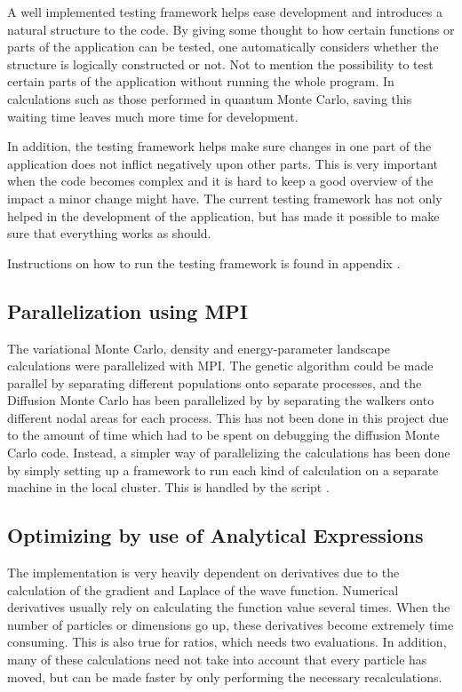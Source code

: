 \documentclass[aps,prb,twocolumn,floatfix]{revtex4}
\newcommand{\class}[1]{{\sffamily{#1}}}
\begin{document}
A well implemented testing framework helps ease development and introduces a natural structure to the code. By giving some thought to how certain functions or parts of the application can be tested, one automatically considers whether the structure is logically constructed or not. Not to mention the possibility to test certain parts of the application without running the whole program. In calculations such as those performed in quantum Monte Carlo, saving this waiting time leaves much more time for development.

In addition, the testing framework helps make sure changes in one part of the application does not inflict negatively upon other parts. This is very important when the code becomes complex and it is hard to keep a good overview of the impact a minor change might have. The current testing framework has not only helped in the development of the application, but has made it possible to make sure that everything works as should.

Instructions on how to run the testing framework is found in appendix \label{sec:runtesting}.

\subsection{Parallelization using MPI} \label{sec:mpi}

The variational Monte Carlo, density and energy-parameter landscape calculations were parallelized with MPI. The genetic algorithm could be made parallel by separating different populations onto separate processes, and the Diffusion Monte Carlo has been parallelized by \cite{karl} by separating the walkers onto different nodal areas for each process. This has not been done in this project due to the amount of time which had to be spent on debugging the diffusion Monte Carlo code. Instead, a simpler way of parallelizing the calculations has been done by simply setting up a framework to run each kind of calculation on a separate machine in the local cluster. This is handled by the script \class{automator.py}.

\subsection{Optimizing by use of Analytical Expressions} \label{sec:optimizinganalytic}

The implementation is very heavily dependent on derivatives due to the calculation of the gradient and Laplace of the wave function. Numerical derivatives usually rely on calculating the function value several times. When the number of particles or dimensions go up, these derivatives become extremely time consuming. This is also true for ratios, which needs two evaluations. In addition, many of these calculations need not take into account that every particle has moved, but can be made faster by only performing the necessary recalculations.
\end{document}
